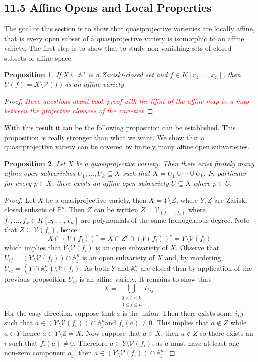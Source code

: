 \documentclass[40pt]{article}
\newcommand{\Proj}{\mathbb{P}}
\newcommand{\A}{\mathbb{A}}
\newcommand{\V}{\mathcal{V}}
\newcommand{\note}[1]{\textcolor{red}{\emph{#1}}}
\newtheorem{proposition}{Proposition}[section]
\theoremstyle{remark}
\begin{document}
			\subsection{11.5 Affine Opens and Local Properties}
			The goal of this section is to show that quasiprojective varieities are locally affine, that is every open subset of a quasiprojective variety is isomorphic to an affine variety. The first step is to show that to study non-vanishing sets of closed subsets of affine space. 
			\begin{proposition}
				If $X \subseteq \A^n$ is a Zariski-closed set and $f \in K[x_1,\dots,x_n]$, then $U(f) = X \setminus \V(f)$ is an affine variety
			\end{proposition}
			\begin{proof}
				\note{Have questions about book proof with the lifint of the affine map to a map between the projective closures of the varieties}
			\end{proof}
			With this result it can be the following proposition can be established. This proposition is really stronger than what we want. We show that a quasirprojective variety can be covered by finitely many affine open subvarieties. 
			\begin{proposition}
				Let $X$ be a quasiprojective variety. Then there exist finitely many affine open subvarieties $U_1,\dots, U_k \subseteq X$ such that $X = U_1 \cup  \cdots\cup U_k$. In particular for every $p \in X$, there exists an affine open subvariety $U \subseteq X$ where $p \in U$. 
			\end{proposition}
			\begin{proof}
				Let $X$ be a quasiprojective variety, then $X = Y \setminus Z$, where $Y,Z$ are Zariski-closed subsets of $\Proj^n$. Then $Z$ can be written $Z = \V_(f_1,\dots,f_k)$ where $f_1,\dots,f_k \in K[x_0,\dots,x_n]$ are polynomials of the same homogeneous degree. Note that $Z \subseteq \V(f_i)$, hence 
				\[
				X \cap (\V(f_i))^c = X \cap Z^c \cap (V(f_i))^c = Y \setminus \V(f_i)
				\]
				which implies that $Y\setminus \V(f_i)$ is an open subvariety of $X$. Observe that $U_{ij} = (Y \setminus \V(f_i))\cap \A^n_j$ is an open subvariety of $X$ and, by reordering,  $U_{ij} = (Y \cap \A^n_j)\setminus \V(f_i)$. As both $Y$ and $\A^n_j$ are closed then by application of the previous propsoition $U_{ij}$ is an affine variety. It remains to show that 
				\[
				X = \bigcup_{\substack{0 \leq i \leq k \\ 0 \leq j \leq n}} U_{ij}.
				\]
				For the easy direction, suppose that $a$ is the union. Then there exists some $i,j$ such that $a \in (Y \setminus \V(f_i)) \cap \A_j^n$and $f_i(a) \neq 0$. This implies that $a \not \in Z$ while $a \in Y$ hence $a \in Y \setminus Z = X$. Now suppose that $a \in X$, then $a \not \in Z$ so there exists an $i$ such that $f_i(a) \neq 0$. Therefore $a \in Y \setminus \V(f_i)$, as $a$ must have at least one non-zero component $a_j$, then $a \in (Y \setminus \V(f_i)) \cap \A_j^n$. 
			\end{proof}
\end{document}
